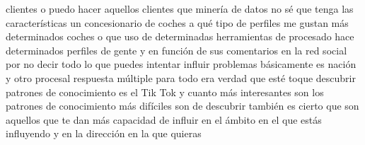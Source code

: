 \documentclass[12pt, a4paper]{article}
\begin{document}
clientes o puedo hacer aquellos clientes que minería de datos no sé que tenga las características un concesionario de coches a qué tipo de perfiles me gustan más determinados coches o que uso de determinadas herramientas de procesado hace determinados perfiles de gente y en función de sus comentarios en la red social por no decir todo lo que puedes intentar influir problemas básicamente es nación y otro procesal respuesta múltiple para todo era verdad que esté toque descubrir patrones de conocimiento es el Tik Tok y cuanto más interesantes son los patrones de conocimiento más difíciles son de descubrir también es cierto que son aquellos que te dan más capacidad de influir en el ámbito en el que estás influyendo y en la dirección en la que quieras 

\nocite{*}

\end{document}
